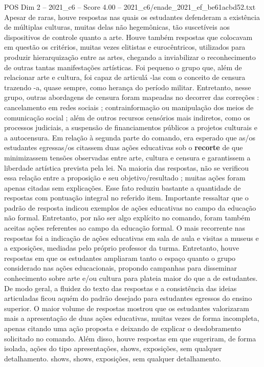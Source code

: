 \begin{textsample}{POS Dim 2 – 2021\_c6 – Score 4.00 – 2021\_c6/enade\_2021\_ef\_be61acbd52.txt}
Apesar de raras, houve respostas nas quais os estudantes defenderam a existência de múltiplas culturas, muitas delas não hegemônicas, tão suscetíveis aos dispositivos de controle quanto a arte.
Houve também respostas que colocavam em questão os critérios, muitas vezes elitistas e eurocêntricos, utilizados para produzir hierarquização entre as artes, chegando a inviabilizar o reconhecimento de outras tantas manifestações artísticas.
Foi pequeno o grupo que, além de relacionar arte e cultura, foi capaz de articulá -las com o conceito de censura trazendo -a, quase sempre, como herança do período militar.
Entretanto, nesse grupo, outras abordagens de censura foram mapeadas no decorrer das correções : cancelamento em redes sociais ; contrainformação ou manipulação dos meios de comunicação social ; além de outros recursos censórios mais indiretos, como os processos judiciais, a suspensão de financiamentos públicos a projetos culturais e a autocensura.
Em relação à segunda parte do comando, era esperado que as/os estudantes egressas/os citassem duas ações educativas sob o \textbf{recorte} de que minimizassem tensões observadas entre arte, cultura e censura e garantissem a liberdade artística prevista pela lei.
Na maioria das respostas, não se verificou essa relação entre a proposição e seu objetivo/resultado ; muitas ações foram apenas citadas sem explicações.
Esse fato reduziu bastante a quantidade de respostas com pontuação integral no referido item.
Importante ressaltar que o padrão de resposta indicou exemplos de ações educativas no campo da educação não formal.
Entretanto, por não ser algo explícito no comando, foram também aceitas ações referentes ao campo da educação formal.
O mais recorrente nas respostas foi a indicação de ações educativas em sala de aula e visitas a museus e a exposições, mediadas pelo próprio professor da turma.
Entretanto, houve respostas em que os estudantes ampliaram tanto o espaço quanto o grupo considerado nas ações educacionais, propondo campanhas para disseminar conhecimento sobre arte e/ou cultura para plateia maior do que a de estudantes.
De modo geral, a fluidez do texto das respostas e a consistência das ideias articuladas ficou aquém do padrão desejado para estudantes egressos do ensino superior.
O maior volume de respostas mostrou que os estudantes valorizaram mais a apresentação de duas ações educativas, muitas vezes de forma incompleta, apenas citando uma ação proposta e deixando de explicar o desdobramento solicitado no comando.
Além disso, houve respostas em que sugeriram, de forma isolada, ações do tipo apresentações, shows, exposições, sem qualquer detalhamento. shows, shows, exposições, sem qualquer detalhamento.

\end{textsample}
